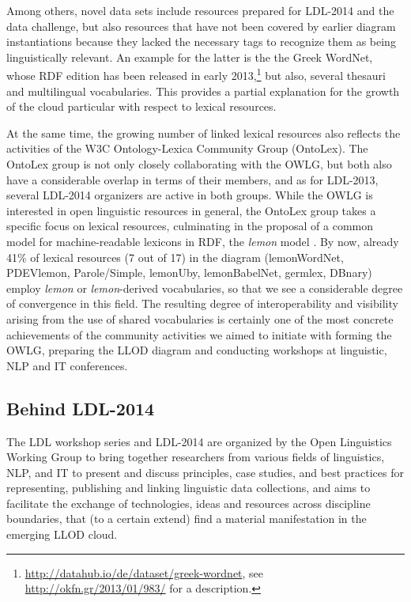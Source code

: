 Among others, novel data sets include resources prepared for LDL-2014 and the data challenge, but also resources that have not been covered by earlier diagram instantiations because they lacked the necessary tags to recognize them as being linguistically relevant. An example for the latter is the the Greek WordNet, whose RDF edition has been released in early 2013,\footnote{
	\url{http://datahub.io/de/dataset/greek-wordnet}, see \url{http://okfn.gr/2013/01/983/} for a description.
}
but also, several thesauri and multilingual vocabularies.
This provides a partial explanation for the growth of the cloud particular with respect to lexical resources. 

At the same time, the growing number of linked lexical resources also reflects the activities of the W3C Ontology-Lexica Community Group (OntoLex). The OntoLex group is not only closely collaborating with the OWLG, but both also have a considerable overlap in terms of their members, and as for LDL-2013, several LDL-2014 organizers are active in both groups.
While the OWLG is interested in open linguistic resources in general, the OntoLex group takes a specific focus on lexical resources, culminating in the proposal of a common model for machine-readable lexicons in RDF, the \emph{lemon} model \cite{mccrae2012integrating}. 
By now, already 41\% of lexical resources (7 out of 17) in the diagram (lemonWordNet, PDEVlemon, Parole/Simple, lemonUby, lemonBabelNet, germlex, DBnary) employ \emph{lemon} or \emph{lemon}-derived vocabularies, so that we see a considerable degree of convergence in this field. 
The resulting degree of interoperability and visibility arising from the use of shared vocabularies is certainly one of the most concrete achievements of the community activities we aimed to initiate with forming the OWLG, preparing the LLOD diagram and conducting workshops at linguistic, NLP and IT conferences.

\subsection{Behind LDL-2014}

The LDL workshop series and LDL-2014 are organized by the Open Linguistics Working Group 
to bring together researchers from various fields of linguistics, NLP, and IT to present and discuss principles, case studies, and best practices for representing, publishing and linking linguistic data collections, and aims to facilitate the exchange of technologies, ideas and resources across discipline boundaries, that (to a certain extend) find a material manifestation in the emerging LLOD cloud.


